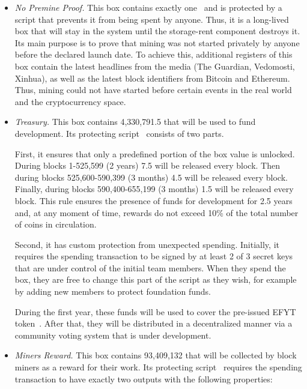 \begin{itemize}
    \item{\em No Premine Proof.} This box contains exactly one~\Erg{} and is protected by a script that prevents it from being spent by anyone.
    Thus, it is a long-lived box that will stay in the system until the storage-rent component
    destroys it.
    Its main purpose is to prove that \Ergo{} mining was not started privately by anyone before
    the declared launch date.
    To achieve this, additional registers of this box contain the latest headlines from the media (The Guardian, Vedomosti, Xinhua), as well as the latest block identifiers from Bitcoin and Ethereum.
    Thus, \Ergo{} mining could not have started before certain events in the real world and the cryptocurrency space.

    \item{\em Treasury.} This box contains 4,330,791.5 \Erg{} that will be used to fund \Ergo{}
    development.
    Its protecting script~\cite{scriptTreasury} consists of two parts.

    First, it ensures that only a predefined portion of the box value is unlocked.
    During blocks 1-525,599 (2 years) 7.5 \Erg{} will be released every block. Then during blocks 525,600-590,399 (3 months) 4.5 \Erg{} will be released every block. Finally,
    during blocks 590,400-655,199 (3 months) 1.5 \Erg{} will be released every block.
    This rule ensures the presence of funds for \Ergo{} development for 2.5 years and, at any moment of time,
    rewards do not exceed 10\% of the total number of coins in circulation.

    Second, it has custom protection from unexpected spending.
    Initially, it requires the spending transaction to be signed by at least 2 of 3 secret keys that are under control of the initial team members. When they spend the box, they are free to
    change this part of the script as they wish, for example by adding new members to protect foundation
    funds.

    During the first year, these funds will be used to cover the pre-issued EFYT token~\cite{our website with swap }. After that, they will be distributed in a decentralized manner via a community voting system that is under development.


    \item{\em Miners Reward.} This box contains 93,409,132 \Erg{} that will be collected by block miners
    as a reward for their work.
    Its protecting script~\cite{scriptEmission} requires the spending transaction to have exactly two outputs with the following properties:


\end{itemize}
